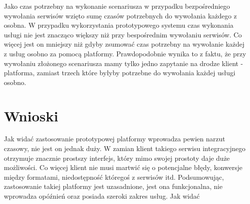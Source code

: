 \newpage
Jako czas potrzebny na wykonanie scenariusza w przypadku bezpośredniego wywołania serwisów wzięto sumę czasów potrzebnych do wywołania każdego z osobna. W przypadku wykorzystania prototypowego systemu czas wykonania usługi nie jest znacząco większy niż przy bespośrednim wywołaniu serwisów. Co więcej jest on mniejszy niż gdyby zsumować czas potrzebny na wywołanie każdej z usług osobno za pomocą platformy. Prawdopodobnie wynika to z faktu, że przy wywołaniu złożonego scenariusza mamy tylko jedno zapytanie na drodze klient - platforma, zamiast trzech które byłyby potrzebne do wywołania każdej usługi osobno.  

\section{Wnioski}
Jak widać zastosowanie prototypowej  platformy wprowadza pewien narzut czasowy, nie jest on jednak duży. W zamian klient takiego serwisu integracyjnego otrzymuje znacznie prostszy interfejs, który mimo swojej prostoty daje duże możliwości. Co więcej klient nie musi martwić się o potencjalne błędy, konwersje między formatami, niedostępność któregoś z serwisów itd. Podsumowując, zastosowanie takiej platformy jest uzasadnione, jest ona funkcjonalna, nie wprowadza opóźnień oraz posiada szeroki zakres usług. 
Jak widać 

